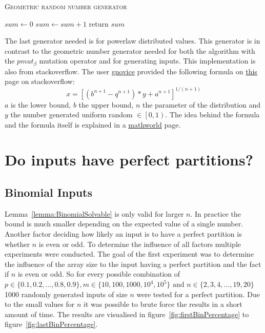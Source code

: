 \begin{algorithm}[h]
      \caption{\textsc{Geometric random number generator}}\label{alg:geometricRNG}

      \DontPrintSemicolon %
      $sum \leftarrow 0$\; \tcp{random() generates a random value $\in \left[0, 1\right)$}
      {
            $sum \leftarrow sum+1$\;
      }
      return $sum$\;
\end{algorithm}

The last generator needed is for powerlaw distributed values.
This generator is in contrast to the geometric number generator needed for both the algorithm with the $pmut_\beta$ mutation operator and for generating inputs.
This implementation is also from stackoverflow. The user \href{https://stackoverflow.com/users/52738/gnovice}{gnovice} provided the following formula on \href{https://stackoverflow.com/questions/918736/random-number-generator-that-produces-a-power-law-distribution}{this} page on stackoverflow:
\[
      x = {[(b^{n+1} - q^{n+1})*y + a^{n+1}]}^{1/(n+1)}
\]
$a$ is the lower bound, $b$ the upper bound, $n$ the parameter of the distribution and $y$ the number generated uniform random $\in \left[0, 1\right)$.
The idea behind the formula and the formula itself is explained in a \href{https://mathworld.wolfram.com/RandomNumber.html}{mathworld} page.

\section{Do inputs have perfect partitions?}
\subsection{Binomial Inputs}

Lemma~\ref{lemma:BinomialSolvable} is only valid for larger $n$.
In practice the bound is much smaller depending on the expected value of a single number.
Another factor deciding how likely an input is to have a perfect partition is whether $n$ is even or odd.
To determine the influence of all factors multiple experiments were conducted.
The goal of the first experiment was to determine the influence of the array size to the input having a perfect partition and the fact if $n$ is even or odd.
So for every possible combination of $p \in \{0.1, 0.2, \dots , 0.8, 0.9\}, m \in \{10,100,1000,10^4,10^5\} \text{ and } n \in \{2,3,4,\dots,19,20\}$ 1000 randomly generated inputs of size $n$ were tested for a perfect partition.
Due to the small values for $n$ it was possible to brute force the results in a short amount of time.
The results are visualised in figure~\ref{fig:firstBinPercentage} to figure~\ref{fig:lastBinPercentage}.

